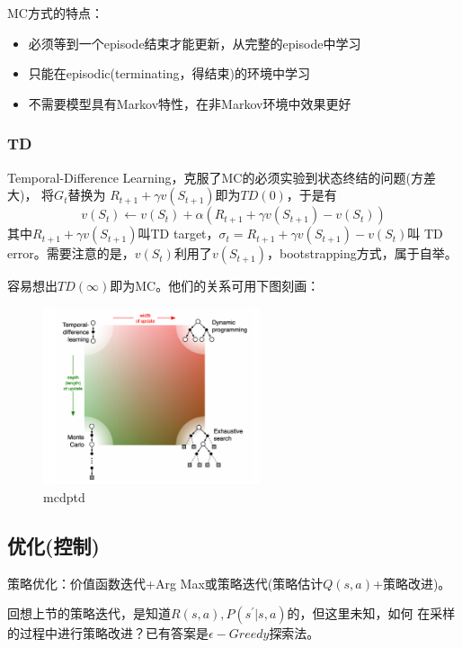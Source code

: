 \documentclass[UTF8]{ctexart}
\begin{document}
MC方式的特点：
\begin{itemize}
    \item 必须等到一个episode结束才能更新，从完整的episode中学习
    \item 只能在episodic(terminating，得结束)的环境中学习
    \item 不需要模型具有Markov特性，在非Markov环境中效果更好
\end{itemize}

\subsubsection{TD}
Temporal-Difference Learning，克服了MC的必须实验到状态终结的问题(方差大)，
将$G_t$替换为
$R_{t+1} + \gamma v(S_{t+1})$即为$TD(0)$，于是有
\begin{equation}v\left(S_{t}\right) \leftarrow v\left(S_{t}\right)+\alpha\left(R_{t+1}+\gamma v\left(S_{t+1}\right)-v\left(S_{t}\right)\right) \label{TDV} 
\end{equation}
其中$R_{t+1} + \gamma v(S_{t+1})$叫TD target，$\sigma_t=R_{t+1} + \gamma v(S_{t+1})-v(S_t)$叫
TD error。需要注意的是，$v(S_t)$利用了$v(S_{t+1})$，bootstrapping方式，属于自举。

容易想出$TD(\infty)$即为MC。他们的关系可用下图刻画：

\begin{figure}[htbp]
	\centering
	\includegraphics[width=6.4cm, height=5.2cm]{./pic/td_mc_dp_diff.png}
	\caption{mcdptd}
\end{figure}

\subsection{优化(控制)}
策略优化：价值函数迭代+Arg Max或策略迭代(策略估计$Q(s, a)$+策略改进)。

回想上节的策略迭代，是知道$R(s, a), P(s^{\prime}|s, a)$的，但这里未知，如何
在采样的过程中进行策略改进？已有答案是$\epsilon-Greedy$探索法。
\end{document}
